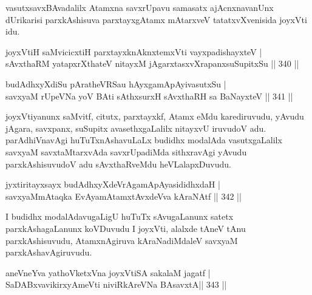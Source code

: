 \begin{artha}
vasutxsavxBAvadalilx Atamxna savxrUpavu samasatx ajAcnxnavanUnx dUrikarisi parxkAshisuva parxtayxgAtamx mAtarxveV tatatxvXvenisida joyxVti idu.
\end{artha}


\begin{shl}
joyxVtiH saMvicicxtiH parxtayxknAknxtemxVti vayxpadishayxteV | \\
sAvxthaRM yatapxrXthateV nitayxM jAgarxtasxvXrapanxsuSupitxSu \hfill||  340 || 
\end{shl}
				
\begin{shl}
budAdhxyXdiSu pAratheVRSau hAyxgamApAyivasutxSu | \\
savxyaM rUpeVNa yoV BAti sAthxsurxH sAvxthaRH sa BaNayxteV \hfill||  341 ||  
\end{shl}

\begin{artha}
joyxVtiyanunx saMvitf, citutx, parxtayxkf, Atamx eMdu karediruvudu, yAvudu jAgara, savxpanx, suSupitx avasethxgaLalilx nitayxvU iruvudoV adu. parAdhiVnavAgi huTuTxnAshavuLaLx budidhx modalAda vasutxgaLalilx savxyaM savxtaMtarxvAda savxrUpadiMda sithxravAgi yAvudu parxkAshisuvudoV adu sAvxthaRveMdu heVLalapxDuvudu.
\end{artha}

\begin{shl}
jyxtiritayxsayx budAdhxyXdeVrAgamApAyasididhxdaH | \\
savxyaMmAtaqka EvAyamAtamxtAvxdeVva kAraNAtf \hfill||  342 ||  
\end{shl}

\begin{artha}
I budidhx modalAdavugaLigU huTuTx sAvugaLanunx satetx parxkAshagaLanunx koVDuvudu I joyxVti, alalxde tAneV tAnu parxkAshisuvudu, AtamxnAgiruva kAraNadiMdaleV savxyaM parxkAshavAgiruvudu.
\end{artha}

\begin{shl}
aneVneYva yathoVketxVna joyxVtiSA sakalaM jagatf | \\
\footnotemark[1]{}SaDABxvavikirxyAmeVti niviRkAreVNa BAsavxtA\hfill||  343 || 
\end{shl}

